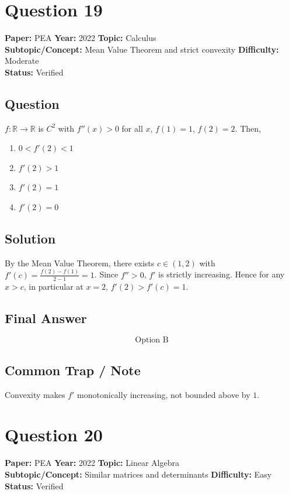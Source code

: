 \documentclass[11pt]{article}
\begin{document}
\section*{Question 19}
\textbf{Paper:} PEA \quad \textbf{Year:} 2022 \quad \textbf{Topic:} Calculus \\
\textbf{Subtopic/Concept:} Mean Value Theorem and strict convexity \quad \textbf{Difficulty:} Moderate \\
\textbf{Status:} Verified

\subsection*{Question}
$f : \mathbb R \to \mathbb R$ is $C^2$ with $f''(x) > 0$ for all $x$, $f(1)=1$, $f(2)=2$.
Then,
\begin{enumerate}[label=(\Alph*)]
\item $0 < f'(2) < 1$
\item $f'(2) > 1$
\item $f'(2) = 1$
\item $f'(2) = 0$
\end{enumerate}

\subsection*{Solution}
By the Mean Value Theorem, there exists $c \in (1,2)$ with $f'(c) = \frac{f(2)-f(1)}{2-1} = 1$.
Since $f'' > 0$, $f'$ is strictly increasing. Hence for any $x > c$, in particular at $x = 2$,
$f'(2) > f'(c) = 1$.

\subsection*{Final Answer}
\[
\boxed{\text{Option B}}
\]

\subsection*{Common Trap / Note}
Convexity makes $f'$ monotonically increasing, not bounded above by $1$.

\section*{Question 20}
\textbf{Paper:} PEA \quad \textbf{Year:} 2022 \quad \textbf{Topic:} Linear Algebra \\
\textbf{Subtopic/Concept:} Similar matrices and determinants \quad \textbf{Difficulty:} Easy \\
\textbf{Status:} Verified
\end{document}
